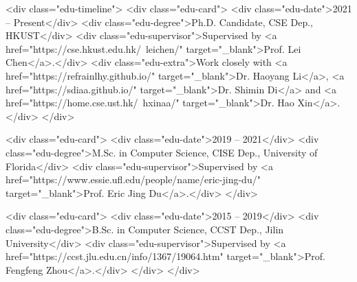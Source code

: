 <div class="edu-timeline">
    <div class="edu-card">
        <div class="edu-date">2021 -- Present</div>
        <div class="edu-degree">Ph.D. Candidate, CSE Dep., HKUST</div>
        <div class="edu-supervisor">Supervised by <a href="https://cse.hkust.edu.hk/~leichen/" target="_blank">Prof. Lei Chen</a>.</div>
        <div class="edu-extra">Work closely with <a href="https://refrainlhy.github.io/" target="_blank">Dr. Haoyang Li</a>, <a href="https://sdiaa.github.io/" target="_blank">Dr. Shimin Di</a> and <a href="https://home.cse.ust.hk/~hxinaa/" target="_blank">Dr. Hao Xin</a>.</div>
    </div>

    <div class="edu-card">
        <div class="edu-date">2019 -- 2021</div>
        <div class="edu-degree">M.Sc. in Computer Science, CISE Dep., University of Florida</div>
        <div class="edu-supervisor">Supervised by <a href="https://www.essie.ufl.edu/people/name/eric-jing-du/" target="_blank">Prof. Eric Jing Du</a>.</div>
    </div>

    <div class="edu-card">
        <div class="edu-date">2015 -- 2019</div>
        <div class="edu-degree">B.Sc. in Computer Science, CCST Dep., Jilin University</div>
        <div class="edu-supervisor">Supervised by <a href="https://ccst.jlu.edu.cn/info/1367/19064.htm" target="_blank">Prof. Fengfeng Zhou</a>.</div>
    </div>
</div>
